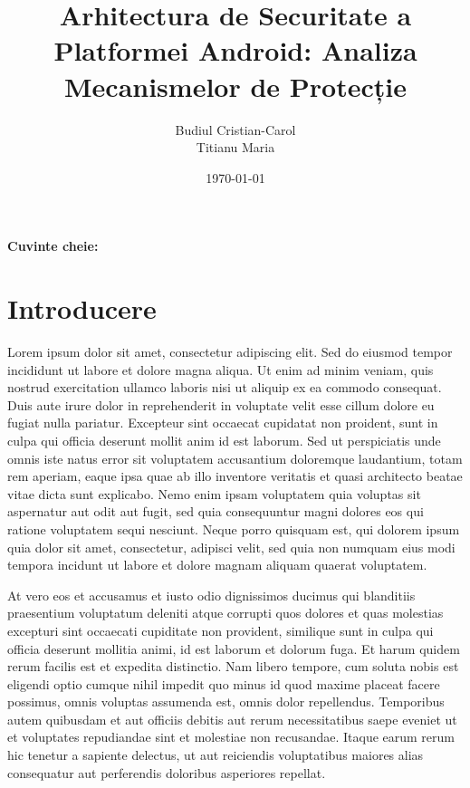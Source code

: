 \documentclass[11pt,a4paper,twocolumn]{article}
\title{Arhitectura de Securitate a Platformei Android: Analiza Mecanismelor de Protecție}
\author{%
    Budiul Cristian-Carol\\[0.1cm]
    Titianu Maria\\[0.3cm]
}
\date{\today}
\theoremstyle{definition}
\theoremstyle{plain}
\theoremstyle{remark}
\begin{document}
\maketitle

\begin{abstract}

\end{abstract}

\textbf{Cuvinte cheie:}

\section{Introducere}

Lorem ipsum dolor sit amet, consectetur adipiscing elit. Sed do eiusmod tempor incididunt ut labore et dolore magna aliqua. Ut enim ad minim veniam, quis nostrud exercitation ullamco laboris nisi ut aliquip ex ea commodo consequat. Duis aute irure dolor in reprehenderit in voluptate velit esse cillum dolore eu fugiat nulla pariatur. Excepteur sint occaecat cupidatat non proident, sunt in culpa qui officia deserunt mollit anim id est laborum. Sed ut perspiciatis unde omnis iste natus error sit voluptatem accusantium doloremque laudantium, totam rem aperiam, eaque ipsa quae ab illo inventore veritatis et quasi architecto beatae vitae dicta sunt explicabo. Nemo enim ipsam voluptatem quia voluptas sit aspernatur aut odit aut fugit, sed quia consequuntur magni dolores eos qui ratione voluptatem sequi nesciunt. Neque porro quisquam est, qui dolorem ipsum quia dolor sit amet, consectetur, adipisci velit, sed quia non numquam eius modi tempora incidunt ut labore et dolore magnam aliquam quaerat voluptatem.

At vero eos et accusamus et iusto odio dignissimos ducimus qui blanditiis praesentium voluptatum deleniti atque corrupti quos dolores et quas molestias excepturi sint occaecati cupiditate non provident, similique sunt in culpa qui officia deserunt mollitia animi, id est laborum et dolorum fuga. Et harum quidem rerum facilis est et expedita distinctio. Nam libero tempore, cum soluta nobis est eligendi optio cumque nihil impedit quo minus id quod maxime placeat facere possimus, omnis voluptas assumenda est, omnis dolor repellendus. Temporibus autem quibusdam et aut officiis debitis aut rerum necessitatibus saepe eveniet ut et voluptates repudiandae sint et molestiae non recusandae. Itaque earum rerum hic tenetur a sapiente delectus, ut aut reiciendis voluptatibus maiores alias consequatur aut perferendis doloribus asperiores repellat.
\end{document}

